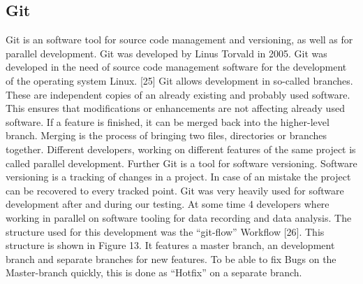 \subsection{Git}
Git is an software tool for source code management and versioning, as well as for parallel development. Git was developed by Linus Torvald in 2005. Git was developed in the need of source code management software for the development of the operating system Linux. [25]
Git allows development in so-called branches. These are independent copies of an already existing and probably used software. This ensures that modifications or enhancements are not affecting already used software. If a feature is finished, it can be merged back into the higher-level branch. Merging is the process of bringing two files, directories or branches together.
Different developers, working on different features of the same project is called parallel development.
Further Git is a tool for software versioning. Software versioning is a tracking of changes in a project. In case of an mistake the project can be recovered to every tracked point.
Git was very heavily used for software development after and during our testing. At some time 4 developers where working in parallel on software tooling for data recording and data analysis. The structure used for this development was the “git-flow” Workflow [26]. This structure is shown in Figure 13. It features a master branch, an development branch and separate branches for new features. To be able to fix Bugs on the Master-branch quickly, this is done as “Hotfix” on a separate branch.



